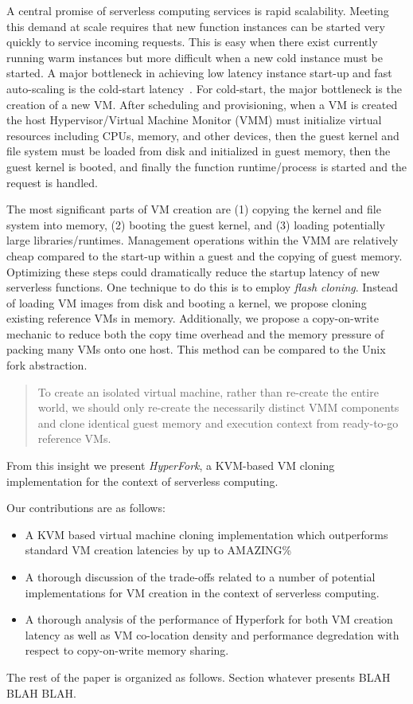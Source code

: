  A central promise of
serverless computing services is rapid scalability. Meeting this demand at
scale requires that new function instances can be started very quickly to
service incoming requests. This is easy when there exist currently running
warm instances but more difficult when a new cold instance must
be started. A major bottleneck in achieving low latency instance start-up and
fast auto-scaling is the cold-start latency~\cite{peeking}. For cold-start, the
major bottleneck is the creation of a new VM. After scheduling and
provisioning, when a VM is created the host Hypervisor/Virtual Machine Monitor
(VMM) must initialize virtual resources including CPUs, memory, and other
devices, then the guest kernel and file system must be loaded from disk and
initialized in guest memory, then the guest kernel is booted, and finally the
function runtime/process is started and the request is handled.

 The most significant parts of VM creation are (1)
copying the kernel and file system into memory, (2) booting the guest kernel,
and (3) loading potentially large libraries/runtimes. Management operations
within the VMM are relatively cheap compared to the start-up within a guest and
the copying of guest memory. Optimizing these steps could dramatically reduce
the startup latency of new serverless functions. One technique to do this is to
employ \emph{flash cloning}. Instead of loading VM images from disk and booting
a kernel, we propose cloning existing reference VMs in memory. Additionally, we
propose a copy-on-write mechanic to reduce both the copy time overhead and the
memory pressure of packing many VMs onto one host. This method can be compared
to the Unix fork abstraction.


\begin{quote} To create an isolated virtual machine, rather than re-create the
entire world, we should only re-create the necessarily distinct VMM components
and clone identical guest memory and execution context from ready-to-go
reference VMs.
\end{quote}

From this insight we present \emph{HyperFork}, a KVM-based VM cloning
implementation for the context of serverless computing.

 Our contributions are as follows: \begin{itemize}
\item A KVM based virtual machine cloning implementation which outperforms
standard VM creation latencies by up to AMAZING\%
\item A thorough discussion of the trade-offs related to a number of potential
implementations for VM creation in the context of serverless computing.
\item A thorough analysis of the performance of Hyperfork for both VM creation
latency as well as VM co-location density and performance degredation with
respect to copy-on-write memory sharing.
\end{itemize}

The rest of the paper is organized as follows. Section whatever presents BLAH
BLAH BLAH.
